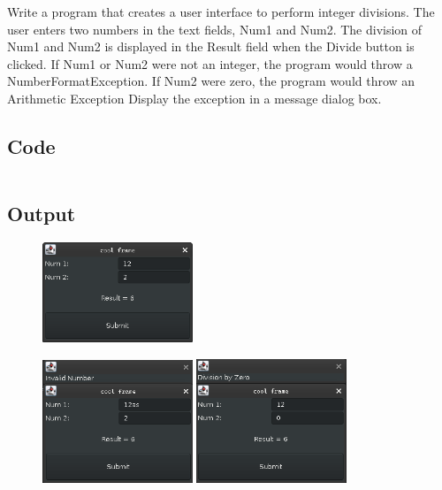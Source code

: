 \documentclass[../main.tex]{subfiles}
\begin{document}
Write a program that creates a user interface to perform integer divisions.
The user enters two numbers in the text fields, Num1 and Num2. The division of
Num1 and Num2 is displayed in the Result field when the Divide button is
clicked. If Num1 or Num2 were not an integer, the program would throw a
NumberFormatException. If Num2 were zero, the program would throw an Arithmetic
Exception Display the exception in a message dialog box.

\subsection{Code}
\inputminted[frame=lines, breaklines, breakanywhere, numberblanklines=false]{java}{./programs/prog16/Dialog.java}

\subsection{Output}
\begin{figure}[h!]
	\centering
	\includegraphics[width=0.4\textwidth]{./assets/p16-s1.png}
\end{figure}
\begin{figure}[h!]
	\centering
	\includegraphics[width=0.4\textwidth]{./assets/p16-s2.png}
	\includegraphics[width=0.4\textwidth]{./assets/p16-s3.png}
\end{figure}
\end{document}
